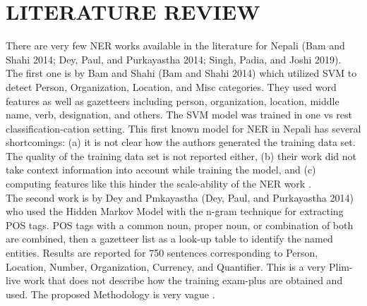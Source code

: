 \chapter{LITERATURE REVIEW}




There are very few NER works available in the literature for Nepali (Bam and Shahi 2014; Dey, Paul, and Purkayastha 2014; Singh, Padia, and Joshi 2019). The first one is by Bam and Shahi (Bam and Shahi 2014) which utilized SVM to detect Person, Organization, Location, and Misc categories. They used word features as well as gazetteers including person, organization, location, middle name, verb, designation, and others. The SVM model was trained in one vs rest classification-cation setting. This first known model for NER in Nepali has several shortcomings: (a) it is not clear how the authors generated the training data set. The quality of the training data set is not reported either, (b) their work did not take context information into account while training the model, and (c) computing features like this hinder the scale-ability of the NER work \cite{1}.\\ 

The second work is by Dey and Pmkayastha (Dey, Paul, and Purkayastha 2014) who used the Hidden Markov Model with the n-gram technique for extracting POS tags. POS tags with a common noun, proper noun, or combination of both are combined, then a gazetteer list as a look-up table to identify the named entities. Results are reported for 750 sentences corresponding to Person, Location, Number, Organization, Currency, and Quantifier. This is a very Plim-live work that does not describe how the training exam-plus are obtained and used. The proposed Methodology is very vague \cite{2}.\\

